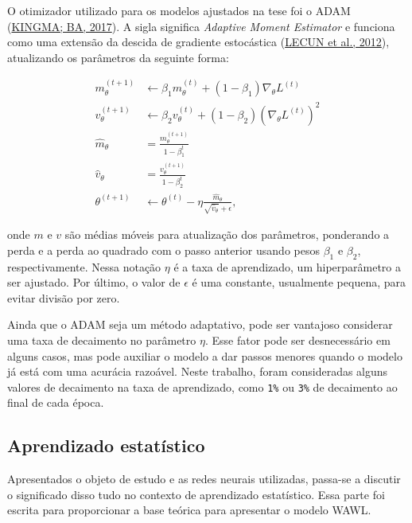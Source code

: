 \documentclass[12pt,twoside,brazilian]{book}
\begin{document}
O otimizador utilizado para os modelos ajustados na tese foi o ADAM
(\protect\hyperlink{ref-kingmaAdamMethodStochastic2017}{KINGMA; BA,
2017}). A sigla significa \emph{Adaptive Moment Estimator} e funciona
como uma extensão da descida de gradiente estocástica
(\protect\hyperlink{ref-lecun2012}{LECUN et al., 2012}), atualizando os
parâmetros da seguinte forma:

\[
\begin{array}{cl}
m_{\theta}^{(t+1)} &\leftarrow \beta_1m_{\theta}^{(t)} + (1-\beta_1)\nabla_\theta L^{(t)} \\
v_{\theta}^{(t+1)} &\leftarrow \beta_2v_{\theta}^{(t)} + (1-\beta_2)(\nabla_\theta L^{(t)})^2 \\
\hat{m}_{\theta} &= \frac{m_\theta^{(t+1)}}{1-\beta_1^t} \\
\hat{v}_{\theta} &= \frac{v_\theta^{(t+1)}}{1-\beta_2^t} \\
\theta^{(t+1)} &\leftarrow \theta^{(t)} - \eta \frac{\hat{m}_{\theta}}{\sqrt{\hat{v}_{\theta}} + \epsilon},
\end{array}
\]

onde \(m\) e \(v\) são médias móveis para atualização dos parâmetros,
ponderando a perda e a perda ao quadrado com o passo anterior usando
pesos \(\beta_1\) e \(\beta_2\), respectivamente. Nessa notação \(\eta\)
é a taxa de aprendizado, um hiperparâmetro a ser ajustado. Por último, o
valor de \(\epsilon\) é uma constante, usualmente pequena, para evitar
divisão por zero.

Ainda que o ADAM seja um método adaptativo, pode ser vantajoso
considerar uma taxa de decaimento no parâmetro \(\eta\). Esse fator pode
ser desnecessário em alguns casos, mas pode auxiliar o modelo a dar
passos menores quando o modelo já está com uma acurácia razoável. Neste
trabalho, foram consideradas alguns valores de decaimento na taxa de
aprendizado, como \texttt{1\%} ou \texttt{3\%} de decaimento ao final de
cada época.

\hypertarget{sec-aprendizado-estatistico}{%
\subsection{Aprendizado estatístico}\label{sec-aprendizado-estatistico}}

Apresentados o objeto de estudo e as redes neurais utilizadas, passa-se
a discutir o significado disso tudo no contexto de aprendizado
estatístico. Essa parte foi escrita para proporcionar a base teórica
para apresentar o modelo WAWL.
\end{document}
